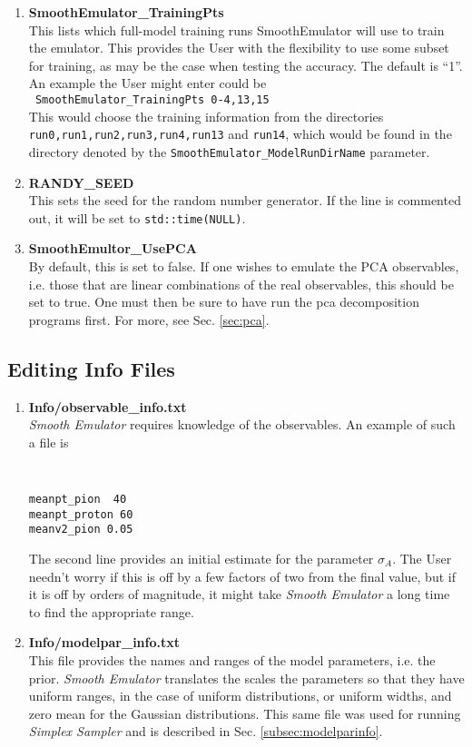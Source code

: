 \documentclass[UserManual.tex]{subfiles}
\begin{document}
\begin{enumerate}
\item {\bf SmoothEmulator\_TrainingPts}\\
This lists which full-model training runs SmoothEmulator will use to train the emulator. This provides the User with the flexibility to use some subset for training, as may be the case when testing the accuracy. The default is ``1''. An example the User might enter could be\\
{\tt ~SmoothEmulator\_TrainingPts  0-4,13,15}\\
This would choose the training information from the directories {\tt run0,run1,run2,run3,run4,run13} and {\tt run14}, which would be found in the directory denoted by the {\tt SmoothEmulator\_ModelRunDirName} parameter.
\item {\bf RANDY\_SEED}\\
This sets the seed for the random number generator. If the line is commented out, it will be set to {\tt std::time(NULL)}.

\item {\bf SmoothEmultor\_UsePCA}\\
By default, this is set to false. If one wishes to emulate the PCA observables, i.e. those that are linear combinations of the real observables, this should be set to true. One must then be sure to have run the pca decomposition programs first. For more, see Sec. \ref{sec:pca}. 

\end{enumerate}


\subsection{Editing Info Files}

\begin{enumerate}

\item {\bf Info/observable\_info.txt}\\
{\it Smooth Emulator} requires knowledge of the observables. An example of such a file is
{\tt
\begin{verbatim}
meanpt_pion  40
meanpt_proton 60
meanv2_pion 0.05
\end{verbatim}
}
The second line provides an initial estimate for the parameter $\sigma_A$. The User needn't worry if this is off by a few factors of two from the final value, but if it is off by orders of magnitude, it might take {\it Smooth Emulator} a long time to find the appropriate range.

\item {\bf Info/modelpar\_info.txt}\\
This file provides the names and ranges of the model parameters, i.e. the prior. {\it Smooth Emulator} translates the scales the parameters so that they have uniform ranges, in the case of uniform distributions, or uniform widths, and zero mean for the Gaussian distributions. This same file was used for running {\it Simplex Sampler} and is described in Sec. \ref{subsec:modelparinfo}. 

\end{enumerate}
\end{document}
